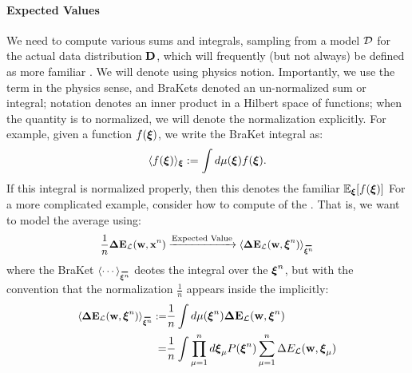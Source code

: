 \paragraph{Expected Values}

We need to compute various sums and integrals, 
sampling from a model $\mathcal{D}$ for the actual data distribution $\mathbf{D}$,
which will frequently (but not always) be defined as more familiar \ExpectedValues.
We will denote \ExpectedValues using physics \BraKet notion.
Importantly, we use the term \ExpectedValue in the physics sense, and BraKets denoted an un-normalized sum or integral;
notation denotes an inner product in a Hilbert space of functions;
when the quantity is  to normalized, we will denote the normalization explicitly.
For example, given a function $f(\boldsymbol{\xi})$, 
we write the BraKet integral as:
\begin{align}
 \label{eqn:EuT}
 \langle f(\boldsymbol{\xi}) \rangle_{\boldsymbol{\xi}}:=\int d\mu(\boldsymbol{\xi}) f(\boldsymbol{\xi})  .
\end{align}
If  this integral is normalized properly, then this denotes the familiar \ExpectedValue $\mathbb{E}_{\boldsymbol{\xi}}[f(\boldsymbol{\xi})]$
For a more complicated example, consider how to compute \ExpectedValue of the \DataSampleError.
That is, we want to model the average \DataSampleError using:
\begin{align}
  \label{eqn:Emap}
  \frac{1}{n}\DETOPX \xrightarrow{\text{Expected Value}} \langle \DETOPXI \rangle_{\AVGNDXIn} %
\end{align}
where the BraKet $\langle\cdots\rangle_{\AVGNDXIn}$ deotes the integral over the \ModelData $\boldsymbol{\xi}^{n}$, but with the convention that the normalization $\tfrac{1}{n}$
appears inside the \BraKet implicitly:
\begin{align}
  \label{eqn:average_data_sample_error}
\nonumber
  \langle \DETOPXI\rangle_{\AVGNDXIn}
  :=  &\frac{1}{n}\int d\mu(\NDXIn) \DETOPXI \\ 
  = &
  \frac{1}{n}\int \prod_{\mu=1}^{n}d\XI_{\mu}P(\NDXIn) \sum_{\mu=1}^{n}\DETmu
\end{align}
